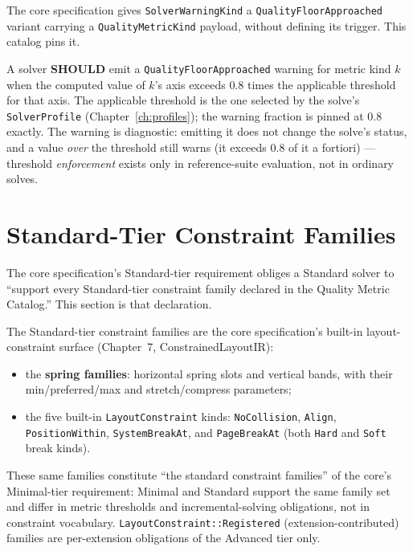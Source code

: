 \documentclass[11pt,letterpaper]{report}
\newcommand{\sectionsc}[1]{{\addfontfeatures{Letters=SmallCaps}#1}}
\newcounter{requirement}[chapter]
\newcommand{\SHOULD}{\textbf{SHOULD}}
\begin{document}
The core specification gives \texttt{SolverWarningKind} a
\texttt{QualityFloorApproached} variant carrying a
\texttt{QualityMetricKind} payload, without defining its trigger. This
catalog pins it.

\begin{requirement}
\label{req:qmc:floor-warning}
A solver \SHOULD{} emit a \texttt{QualityFloorApproached} warning for
metric kind $k$ when the computed value of $k$'s axis exceeds
$\mathbf{0.8}$ times the applicable threshold for that axis. The
applicable threshold is the one selected by the solve's
\texttt{SolverProfile} (Chapter~\ref{ch:profiles});
the warning fraction is pinned at $0.8$ exactly. The warning is
diagnostic: emitting it does not change the solve's status, and a value
\emph{over} the threshold still warns (it exceeds $0.8$ of it a
fortiori) --- threshold \emph{enforcement} exists only in reference-suite
evaluation, not in ordinary solves.
\end{requirement}

\section{Standard-Tier Constraint Families}
\label{sec:thresholds:families}

The core specification's Standard-tier requirement obliges a Standard
solver to ``support every Standard-tier constraint family declared in the
Quality Metric Catalog.'' This section is that declaration.

\begin{requirement}
\label{req:qmc:standard-families}
The Standard-tier constraint families are the core specification's
built-in layout-constraint surface (Chapter~7,
\sectionsc{ConstrainedLayoutIR}):

\begin{itemize}
  \item the \textbf{spring families}: horizontal spring slots and vertical
    bands, with their min/preferred/max and stretch/compress parameters;
  \item the five built-in \texttt{LayoutConstraint} kinds:
    \texttt{NoCollision}, \texttt{Align}, \texttt{PositionWithin},
    \texttt{SystemBreakAt}, and \texttt{PageBreakAt} (both
    \texttt{Hard} and \texttt{Soft} break kinds).
\end{itemize}

These same families constitute ``the standard constraint families'' of
the core's Minimal-tier requirement: Minimal and Standard support the
same family set and differ in metric thresholds and incremental-solving
obligations, not in constraint vocabulary.
\texttt{LayoutConstraint::Registered} (extension-contributed) families
are per-extension obligations of the Advanced tier only.
\end{requirement}
\end{document}
